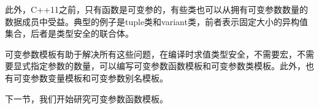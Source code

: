 此外，C++11之前，只有函数是可变参的，有些类也可以从拥有可变参数数量的数据成员中受益。典型的例子是tuple类和variant类，前者表示固定大小的异构值集合，后者是类型安全的联合体。

可变参数模板有助于解决所有这些问题，在编译时求值类型安全，不需要宏，不需要显式指定参数的数量，可以编写可变参数函数模板和可变参数类模板。此外，也有可变参数变量模板和可变参数别名模板。

下一节，我们开始研究可变参数函数模板。






























